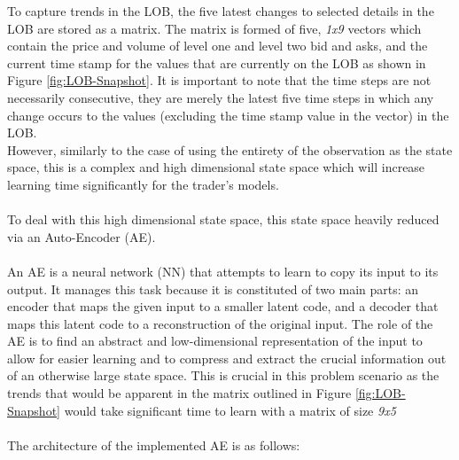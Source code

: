 \documentclass[ %
                    author={Ashwinder Khurana},
                supervisor={Prof Dave Cliff},
                    degree={MEng},
                     title={The Deeply Reinforced Trader},
                  subtitle={},
                      type={enterprise},
                      year={2020} ]{dissertation}
\begin{document}
{\noindent
To capture trends in the LOB, the five latest changes to selected details in the LOB are stored as a matrix. The matrix is formed of five, \textit{1x9} vectors which contain the price and volume of level one and level two bid and asks, and the current time stamp for the values that are currently on the LOB as shown in Figure \ref{fig:LOB-Snapshot}. It is important to note that the time steps are not necessarily consecutive, they are merely the latest five time steps in which any change occurs to the  values (excluding the time stamp value in the vector) in the LOB. 
\\
However, similarly to the case of using the entirety of the observation as the state space, this is a complex and high dimensional state space which will increase learning time significantly for the trader's models.  
\\
\\
To deal with this high dimensional state space, this state space heavily reduced via an Auto-Encoder (AE). 
\\
\\
An AE is a neural network (NN) that attempts to learn to copy its input to its output. It manages this task because it is constituted of two main parts: an encoder that maps the given input to a smaller latent code, and a decoder that maps this latent code to a reconstruction of the original input. The role of the AE is to find an abstract and low-dimensional representation of the input to allow for easier learning and to compress and extract the crucial information out of an otherwise large state space. This is crucial in this problem scenario as the trends that would be apparent in the matrix outlined in Figure \ref{fig:LOB-Snapshot} would take significant time to learn with a matrix of size \textit{9x5}
\\
\\
The architecture of the implemented AE is as follows:
\begin{figure}[H]
\end{figure}}
\end{document}
